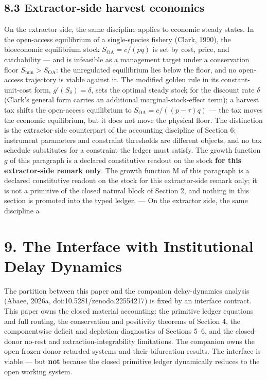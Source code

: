 \documentclass[11pt]{article}
\begin{document}
\subsection*{8.3 Extractor-side harvest economics}\label{83-extractor-side-harvest-economics}

On the extractor side, the same discipline applies to economic steady states. In the open-access equilibrium of a single-species fishery (Clark, 1990), the bioeconomic equilibrium stock \(S_{\mathrm{OA}} = c/(pq)\) is set by cost, price, and catchability --- and is infeasible as a management target under a conservation floor \(S_{\min} > S_{\mathrm{OA}}\): the unregulated equilibrium lies below the floor, and no open-access trajectory is viable against it. The modified golden rule in its constant-unit-cost form, \(g'(S_\delta) = \delta\), sets the optimal steady stock for the discount rate \(\delta\) (Clark's general form carries an additional marginal-stock-effect term); a harvest tax shifts the open-access equilibrium to \(S_{\mathrm{OA}} =\allowbreak{} c/((p - \tau)q)\) --- the tax moves the economic equilibrium, but it does not move the physical floor. The distinction is the extractor-side counterpart of the accounting discipline of Section 6: instrument parameters and constraint thresholds are different objects, and no tax schedule substitutes for a constraint the ledger must satisfy. The growth function \(g\) of this paragraph is a declared constitutive readout on the stock \textbf{for this extractor-side remark only}. The growth function M of this paragraph is a declared constitutive readout on the stock for this extractor-side remark only; it is not a primitive of the closed natural block of Section 2, and nothing in this section is promoted into the typed ledger. --- On the extractor side, the same discipline a

\vspace{0.8em}

\section*{9. The Interface with Institutional Delay Dynamics}\label{9-the-interface-with-institutional-delay-dynamics}

The partition between this paper and the companion delay-dynamics analysis (Abaee, 2026a, doi:10.5281/\allowbreak{}zenodo.22554217) is fixed by an interface contract. This paper owns the closed material accounting: the primitive ledger equations and full routing, the conservation and positivity theorems of Section 4, the componentwise deficit and depletion diagnostics of Sections 5--6, and the closed-donor no-rest and extraction-integrability limitations. The companion owns the open frozen-donor retarded systems and their bifurcation results. The interface is viable --- but \textbf{not} because the closed primitive ledger dynamically reduces to the open working system.
\end{document}
